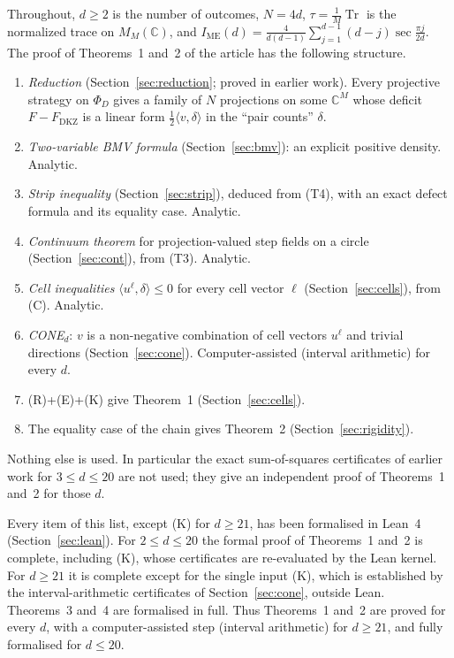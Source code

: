 \documentclass[11pt]{amsart}
\theoremstyle{definition}
\theoremstyle{remark}
\numberwithin{equation}{section}
\newcommand{\C}{\mathbb{C}}
\newcommand{\Tr}{\operatorname{Tr}}
\newcommand{\IME}{I_{\mathrm{ME}}}
\newcommand{\FD}{F_{\mathrm{DKZ}}}
\begin{document}
Throughout, $d\ge2$ is the number of outcomes, $N=4d$, $\tau=\frac1M\Tr$ is the normalized trace on $M_M(\C)$, and
$\IME(d)=\frac{4}{d(d-1)}\sum_{j=1}^{d-1}(d-j)\sec\frac{\pi j}{2d}$. The proof of Theorems~1 and~2 of the article
has the following structure.
\begin{enumerate}
\item[(R)] \emph{Reduction} (Section~\ref{sec:reduction}; proved in earlier work\cite{classical}). Every projective
strategy on $\Phi_D$ gives a family of $N$ projections on some $\C^M$ whose deficit $F-\FD$ is a linear form
$\frac12\langle v,\delta\rangle$ in the ``pair counts'' $\delta$.
\item[(T4)] \emph{Two-variable BMV formula} (Section~\ref{sec:bmv}): an explicit positive density. Analytic.
\item[(T3)] \emph{Strip inequality} (Section~\ref{sec:strip}), deduced from (T4), with an exact defect formula and
its equality case. Analytic.
\item[(C)] \emph{Continuum theorem} for projection-valued step fields on a circle (Section~\ref{sec:cont}), from (T3).
Analytic.
\item[(E)] \emph{Cell inequalities} $\langle u^\ell,\delta\rangle\le0$ for every cell vector $\ell$
(Section~\ref{sec:cells}), from (C). Analytic.
\item[(K)] \emph{CONE$_d$}: $v$ is a non-negative combination of cell vectors $u^\ell$ and trivial directions
(Section~\ref{sec:cone}). Computer-assisted (interval arithmetic) for every $d$.
\item[(A)] (R)+(E)+(K) give Theorem~1 (Section~\ref{sec:cells}).
\item[(B)] The equality case of the chain gives Theorem~2 (Section~\ref{sec:rigidity}).
\end{enumerate}
Nothing else is used. In particular the exact sum-of-squares certificates of earlier work for $3\le d\le20$
\cite{repo} are not used; they give an independent proof of Theorems~1 and~2 for those $d$.

Every item of this list, except (K) for $d\ge21$, has been formalised in Lean~4 (Section~\ref{sec:lean}). For
$2\le d\le20$ the formal proof of Theorems~1 and~2 is complete, including (K), whose certificates are re-evaluated by
the Lean kernel. For $d\ge21$ it is complete except for the single input (K), which is established by the
interval-arithmetic certificates of
Section~\ref{sec:cone}, outside Lean. Theorems~3 and~4 are formalised in full. Thus Theorems~1 and~2 are proved for
every $d$, with a computer-assisted step (interval arithmetic) for $d\ge21$, and fully formalised for $d\le20$.
\end{document}
